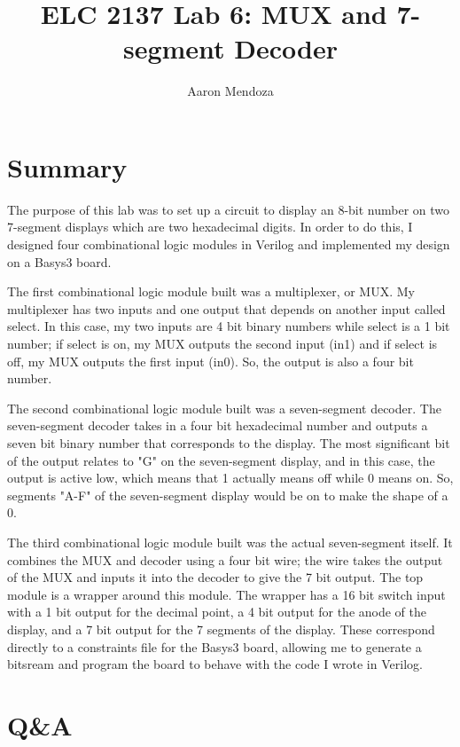 \documentclass[11pt]{article}
\begin{document}
\title{ELC 2137 Lab 6: MUX and 7-segment Decoder}
\author{Aaron Mendoza}

\maketitle


\section*{Summary}

The purpose of this lab was to set up a circuit to display an 8-bit number on two 7-segment displays which are two hexadecimal digits. In order to do this, I designed four combinational logic modules in Verilog and implemented my design on a Basys3 board.

The first combinational logic module built was a multiplexer, or MUX. My multiplexer has two inputs and one output that depends on another input called select. In this case, my two inputs are 4 bit binary numbers while select is a 1 bit number; if select is on, my MUX outputs the second input (in1) and if select is off, my MUX outputs the first input (in0). So, the output is also a four bit number.

The second combinational logic module built was a seven-segment decoder. The seven-segment decoder takes in a four bit hexadecimal number and outputs a seven bit binary number that corresponds to the display. The most significant bit of the output relates to "G" on the seven-segment display, and in this case, the output is active low, which means that 1 actually means off while 0 means on. So, segments "A-F" of the seven-segment display would be on to make the shape of a 0.

The third combinational logic module built was the actual seven-segment itself. It combines the MUX and decoder using a four bit wire; the wire takes the output of the MUX and inputs it into the decoder to give the 7 bit output. The top module is a wrapper around this module. The wrapper has a 16 bit switch input with a 1 bit output for the decimal point, a 4 bit output for the anode of the display, and a 7 bit output for the 7 segments of the display. These correspond directly to a constraints file for the Basys3 board, allowing me to generate a bitsream and program the board to behave with the code I wrote in Verilog. 


\section*{Q\&A}
\end{document}

